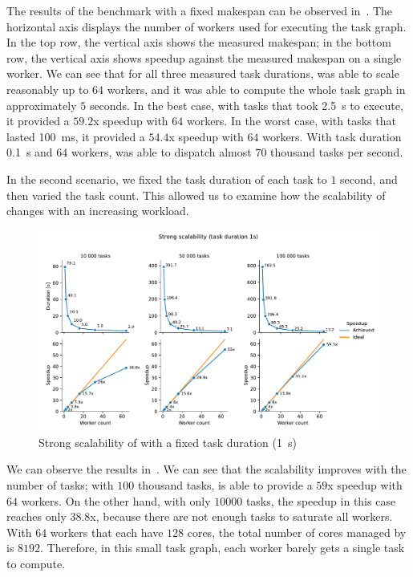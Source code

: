 The results of the benchmark with a fixed makespan can be observed in~. The
horizontal axis displays the number of workers used for executing the task graph. In the top row,
the vertical axis shows the measured makespan; in the bottom row, the vertical axis shows speedup
against the measured makespan on a single worker. We can see that for all three measured task
durations, \hyperqueue{} was able to scale reasonably up to $64$
workers, and it was able to compute the whole task graph in approximately $5$
seconds. In the best case, with tasks that took \SI{2.5}{\second} to execute, it provided a
$59.2$x speedup with $64$ workers. In the worst case, with
tasks that lasted \SI{100}{\milli\second}, it provided a $54.4$x speedup with
$64$ workers. With task duration \SI{0.1}{\second} and
$64$ workers, \hyperqueue{} was able to dispatch almost
$70$ thousand tasks per second.

In the second scenario, we fixed the task duration of each task to $1$ second,
and then varied the task count. This allowed us to examine how the scalability of
\hyperqueue{} changes with an increasing workload.

\begin{figure}[h]
	\centering
	\includegraphics[width=\textwidth]{imgs/hq/charts/scalability-fixed-task-duration}
	\caption{Strong scalability of \hyperqueue{} with a fixed task duration (\SI{1}{\second})}
	\label{fig:hq-scalability-fixed-task-duration}
\end{figure}

We can observe the results in~. We can see that the scalability improves
with the number of tasks; with $100$ thousand tasks, \hyperqueue{} is
able to provide a $59$x speedup with $64$ workers. On the
other hand, with only $10000$ tasks, the speedup in this case reaches only
$38.8$x, because there are not enough tasks to saturate all workers. With
$64$ workers that each have $128$ cores, the total number of
cores managed by \hq{} is $8192$. Therefore, in this small task
graph, each worker barely gets a single task to compute.

